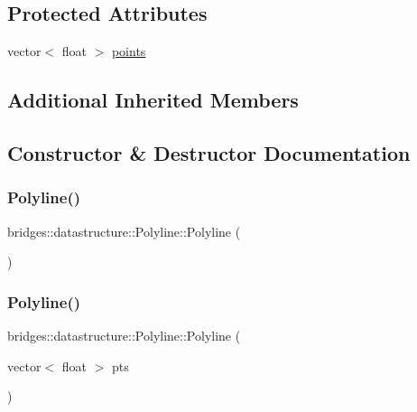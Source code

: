 \subsection*{Protected Attributes}
\begin{DoxyCompactItemize}
\item 
vector$<$ float $>$ \mbox{\hyperlink{classbridges_1_1datastructure_1_1_polyline_a0df21b6c3cc82930a93a495de5affda7}{points}}
\end{DoxyCompactItemize}
\subsection*{Additional Inherited Members}


\subsection{Constructor \& Destructor Documentation}
\mbox{\label{classbridges_1_1datastructure_1_1_polyline_a488f6612485fc66534035c3574281a11}} 
\subsubsection{\texorpdfstring{Polyline()}{Polyline()}\hspace{0.1cm}{\footnotesize\ttfamily [1/2]}}
{\footnotesize\ttfamily bridges\+::datastructure\+::\+Polyline\+::\+Polyline (\begin{DoxyParamCaption}{ }\end{DoxyParamCaption})\hspace{0.3cm}{\ttfamily [inline]}}

\mbox{\label{classbridges_1_1datastructure_1_1_polyline_aceb69c3294ab4c16b2931e1073d3f996}} 
\subsubsection{\texorpdfstring{Polyline()}{Polyline()}\hspace{0.1cm}{\footnotesize\ttfamily [2/2]}}
{\footnotesize\ttfamily bridges\+::datastructure\+::\+Polyline\+::\+Polyline (\begin{DoxyParamCaption}\item[{vector$<$ float $>$}]{pts }\end{DoxyParamCaption})\hspace{0.3cm}{\ttfamily [inline]}}

